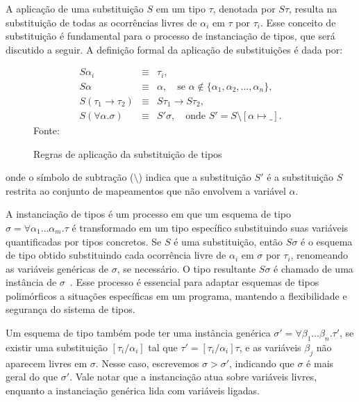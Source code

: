 A aplicação de uma substituição $S$ em um tipo $\tau$, denotada por $S\tau$, resulta na substituição de todas as ocorrências livres de $\alpha_i$ em $\tau$ por $\tau_i$.
Esse conceito de substituição é fundamental para o processo de instanciação de tipos, que será discutido a seguir.
A definição formal da aplicação de substituições é dada por:

\begin{figure}[ht!]
  \caption{Regras de aplicação da substituição de tipos}
  \centering
  \[
    \begin{array}{rcl}
      S\alpha_i                    & \equiv & \tau_i,                                                                          \\[8pt]
      S\alpha                      & \equiv & \alpha, \quad \text{se } \alpha \notin \{\alpha_1, \alpha_2, \ldots, \alpha_n\}, \\[8pt]
      S(\tau_1 \rightarrow \tau_2) & \equiv & S\tau_1 \rightarrow S\tau_2,                                                     \\[8pt]
      S(\forall \alpha.\sigma)     & \equiv & S' \sigma, \quad \text{onde } S' = S \setminus [\alpha \mapsto \_].
    \end{array}
  \]\label{fig:substituicao-tipos}
  \small{Fonte:~\cite{CASTRO2019}}
\end{figure}

onde o símbolo de subtração ($\setminus$) indica que a substituição $S'$ é a substituição $S$ restrita ao conjunto de mapeamentos que não envolvem a variável $\alpha$.

A instanciação de tipos é um processo em que um esquema de tipo $\sigma = \forall \alpha_1 \ldots \alpha_m. \tau$ é transformado em um tipo específico substituindo suas variáveis quantificadas por tipos concretos.
Se $S$ é uma substituição, então $S\sigma$ é o esquema de tipo obtido substituindo cada ocorrência livre de $\alpha_i$ em $\sigma$ por $\tau_i$, renomeando as variáveis genéricas de $\sigma$, se necessário.
O tipo resultante $S\sigma$ é chamado de uma instância de $\sigma$~\cite{DAMAS1982}.
Esse processo é essencial para adaptar esquemas de tipos polimórficos a situações específicas em um programa, mantendo a flexibilidade e segurança do sistema de tipos.

Um esquema de tipo também pode ter uma instância genérica $\sigma' = \forall \beta_1 \ldots \beta_n. \tau'$, se existir uma substituição $[ \tau_i / \alpha_i ]$ tal que $\tau' = [\tau_i / \alpha_i]\tau$, e as variáveis $\beta_j$ não aparecem livres em $\sigma$.
Nesse caso, escrevemos $\sigma > \sigma'$, indicando que $\sigma$ é mais geral do que $\sigma'$.
Vale notar que a instanciação atua sobre variáveis livres, enquanto a instanciação genérica lida com variáveis ligadas.

